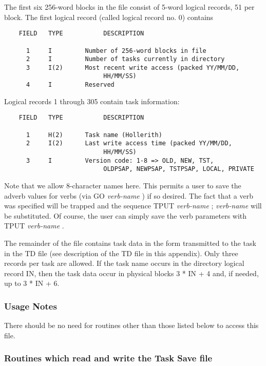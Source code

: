      The first six 256-word blocks in the file consist of 5-word
logical records, 51 per block.  The first logical record (called
logical record no. 0) contains

\begin{verbatim}
    FIELD   TYPE           DESCRIPTION

      1     I         Number of 256-word blocks in file
      2     I         Number of tasks currently in directory
      3     I(2)      Most recent write access (packed YY/MM/DD,
                           HH/MM/SS)
      4     I         Reserved
\end{verbatim}

Logical records 1 through 305 contain task information:

\begin{verbatim}
    FIELD   TYPE           DESCRIPTION

      1     H(2)      Task name (Hollerith)
      2     I(2)      Last write access time (packed YY/MM/DD,
                           HH/MM/SS)
      3     I         Version code: 1-8 => OLD, NEW, TST,
                           OLDPSAP, NEWPSAP, TSTPSAP, LOCAL, PRIVATE
\end{verbatim}

Note that we allow 8-character names here.  This permits a user to
save the adverb values for verbs (via GO {\it verb-name} ) if so
desired.  The fact that a verb was specified will be trapped and the
sequence TPUT {\it verb-name } ; {\it verb-name } will be
substituted.  Of course, the user can simply save the verb parameters
with TPUT {\it verb-name }.

     The remainder of the file contains task data in the form
transmitted to the task in the TD file (see description of the TD file
in this appendix).  Only three records per task are allowed.  If the task
name occurs in the directory logical record IN, then the task data
occur in physical blocks 3 * IN + 4 and, if needed, up to 3 * IN + 6.


\subsubsection{Usage Notes}

     There should be no need for routines other than those listed below
to access this file.


\subsubsection{Routines which read and write the Task Save file}


